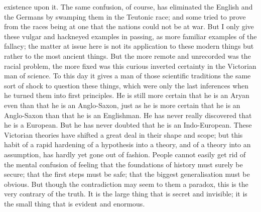 existence upon it. The same confusion, of course, has eliminated the English and the Germans by swamping them in the Teutonic race; and some tried to prove from the races being at one that the nations could not be at war. But I only give these vulgar and hackneyed examples in passing, as more familiar examples of the fallacy; the matter at issue here is not its application to these modern things but rather to the most ancient things. But the more remote and unrecorded was the racial problem, the more fixed was this curious inverted certainty in the Victorian man of science. To this day it gives a man of those scientific traditions the same sort of shock to question these things, which were only the last inferences when he turned them into first principles. He is still more certain that he is an Aryan even than that he is an Anglo-Saxon, just as he is more certain that he is an Anglo-Saxon than that he is an Englishman. He has never really discovered that he is a European. But he has never doubted that he is an Indo-European. These Victorian theories have shifted a great deal in their shape and scope; but this habit of a rapid hardening of a hypothesis into a theory, and of a theory into an assumption, has hardly yet gone out of fashion. People cannot easily get rid of the mental confusion of feeling that the foundations of history must surely be secure; that the first steps must be safe; that the biggest generalisation must be obvious. But though the contradiction may seem to them a paradox, this is the very contrary of the truth. It is the large thing that is secret and invisible; it is the small thing that is evident and enormous.

